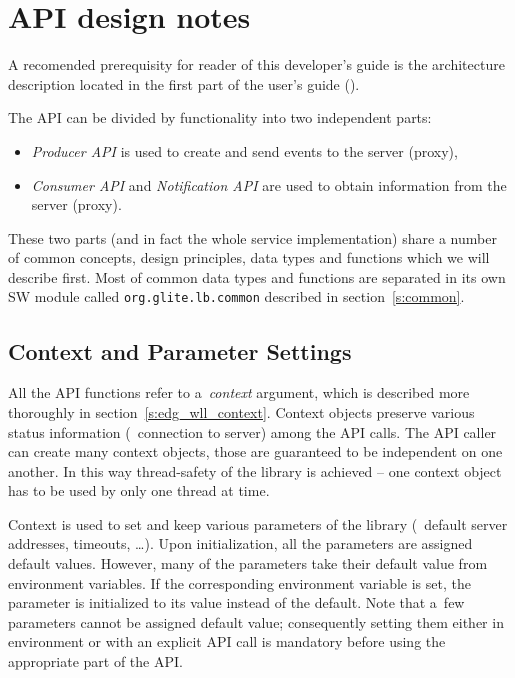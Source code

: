 
\section{\LB API design notes}



A recomended prerequisity for reader of this developer's guide is the
\LB architecture description located in the first part of
the \LB user's guide (\cite{LBUG}).

The \LB API can be divided by functionality into two independent
parts:
\begin{itemize}
\item \textit{\LB Producer API} is used to create and send events to the \LB
server (proxy),
\item \textit{\LB Consumer API} and \textit{\LB
Notification API} are used to obtain information from the  \LB server (proxy).
\end{itemize}
These two parts (and in fact the whole \LB service implementation)
share a number of common concepts, design principles, data types and
functions which we will describe first. Most of common data types and
functions are separated in its own SW module called
\texttt{org.glite.lb.common} described in section~\ref{s:common}.


\subsection{Context and Parameter Settings}
\label{s:context}

All the API functions refer to a~\emph{context} argument, which is
described more thoroughly in section~\ref{s:edg_wll_context}.
Context objects preserve various status information
(\eg\ connection to server) among the API calls.
The API caller can create many context objects, those are guaranteed
to be independent on one another. In this way thread-safety of the
library is achieved -- one context object has to be used by only one
thread at time. 

Context is used to set and keep various parameters of the library
(\eg\ default server addresses, timeouts, \dots).
Upon initialization, all the parameters are assigned default values.
However, many of the parameters take their default value from environment
variables. If the corresponding environment variable is set,
the parameter is initialized to its value instead of the default.
Note that a~few parameters cannot be assigned default value; consequently
setting them either in environment or with an explicit API call
is mandatory before using the appropriate part of the API.

